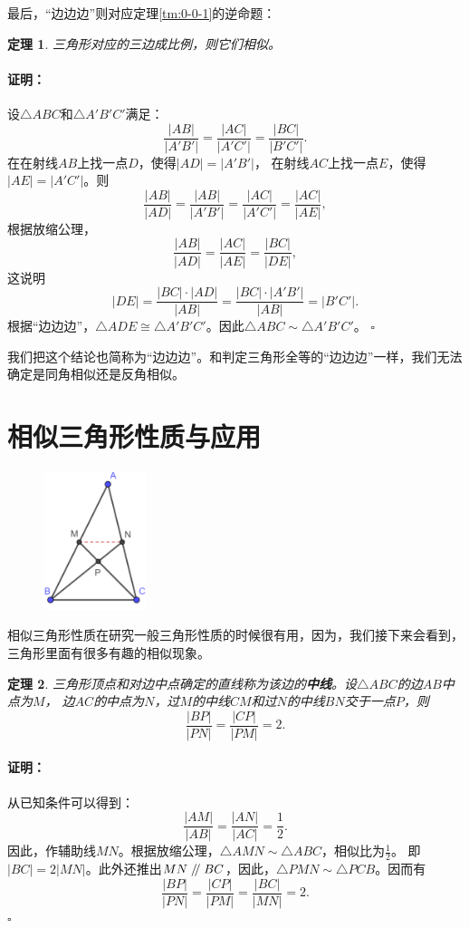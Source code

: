 \documentclass[12pt,UTF8]{ctexbook}
\newtheorem{tm}{定理}[section]
\newenvironment{proof2}{\paragraph{\textbf{证明：}}}{\hfill$\square$}
\renewcommand\parallel{\mathrel{/\mskip-4mu/}}
\begin{document}
最后，“边边边”则对应定理\ref{tm:0-0-1}的逆命题：
\begin{tm}\label{tm:0-1-1}
    三角形对应的三边成比例，则它们相似。
\end{tm}
\begin{proof2}
    设$\triangle ABC$和$\triangle A'B'C'$满足：
    $$ \frac{|AB|}{|A'B'|} = \frac{|AC|}{|A'C'|} = \frac{|BC|}{|B'C'|}.$$
    在在射线$AB$上找一点$D$，使得$|AD| = |A'B'|$，
    在射线$AC$上找一点$E$，使得$|AE| = |A'C'|$。则
    $$ \frac{|AB|}{|AD|} = \frac{|AB|}{|A'B'|} = \frac{|AC|}{|A'C'|} = \frac{|AC|}{|AE|},$$
    根据放缩公理，
    $$ \frac{|AB|}{|AD|} = \frac{|AC|}{|AE|} = \frac{|BC|}{|DE|},$$
    这说明
    $$ |DE| = \frac{|BC|\cdot |AD|}{|AB|} = \frac{|BC|\cdot |A'B'|}{|AB|} = |B'C'|. $$
    根据“边边边”，$\triangle ADE \cong \triangle A'B'C'$。因此$\triangle ABC \sim \triangle A'B'C'$。
\end{proof2}

我们把这个结论也简称为“边边边”。和判定三角形全等的“边边边”一样，我们无法确定是同角相似还是反角相似。

\section{相似三角形性质与应用}

\begin{figure} %
    \vspace{-10pt}
    \includegraphics[width=0.27\textwidth]{tu/三角形8.png}
\end{figure}

相似三角形性质在研究一般三角形性质的时候很有用，因为，我们接下来会看到，三角形里面有很多有趣的相似现象。

\begin{tm}\label{tm:0-2-0}
    三角形顶点和对边中点确定的直线称为该边的\textbf{中线}。设$\triangle ABC$的边$AB$中点为$M$，
    边$AC$的中点为$N$，过$M$的中线$CM$和过$N$的中线$BN$交于一点$P$，则
    $$\frac{|BP|}{|PN|} = \frac{|CP|}{|PM|} = 2.$$
\end{tm}
\begin{proof2}
    从已知条件可以得到：
    $$\frac{|AM|}{|AB|} = \frac{|AN|}{|AC|} = \frac12.$$
    因此，作辅助线$MN$。根据放缩公理，$\triangle AMN \sim \triangle ABC$，相似比为$\frac12$。
    即$|BC| = 2|MN|$。此外还推出$MN \parallel BC$，因此，$\triangle PMN \sim \triangle PCB$。因而有
    $$\frac{|BP|}{|PN|} = \frac{|CP|}{|PM|} = \frac{|BC|}{|MN|} = 2.$$
\end{proof2}
\end{document}
